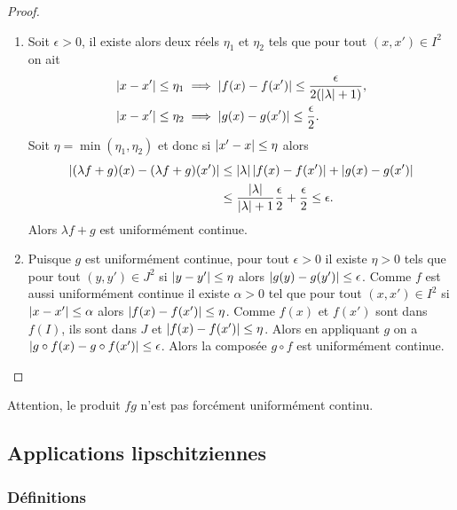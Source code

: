 \begin{proof}
  \begin{enumerate}
  \item Soit $\epsilon >0$, il existe alors deux réels $\eta_1$ et $\eta_2$ tels que pour tout $(x,x') \in I^2$ on ait
    \begin{align}
      \left\lvert x-x'\right\rvert \leq \eta_1 &\implies \left\lvert f(x)-f(x')\right\rvert \leq \frac{\epsilon}{2(\left\lvert\lambda\right\rvert+1)},\\
      \left\lvert x-x'\right\rvert \leq \eta_2 &\implies \left\lvert g(x)-g(x')\right\rvert \leq \frac{\epsilon}{2}.
    \end{align}
    Soit $\eta=\min(\eta_1,\eta_2)$ et donc si $\left\lvert x'-x\right\rvert \leq \eta$ alors 
    \begin{align}
      \left\lvert(\lambda f+g)(x)-(\lambda f+g)(x')\right\rvert &\leq \left\lvert\lambda\right\rvert \left\lvert f(x)-f(x')\right\rvert + \left\lvert g(x)-g(x')\right\rvert \\
      &\leq \frac{\left\lvert\lambda\right\rvert}{\left\lvert\lambda\right\rvert +1} \frac{\epsilon}{2}+\frac{\epsilon}{2} \leq \epsilon.
    \end{align}
    Alors $\lambda f+g$ est uniformément continue.
  \item Puisque $g$ est uniformément continue, pour tout $\epsilon >0$ il existe $\eta >0$ tels que pour tout $(y,y') \in J^2$ si $\left\lvert y-y'\right\rvert \leq \eta$ alors $\left\lvert g(y)-g(y')\right\rvert \leq \epsilon$. Comme $f$ est aussi uniformément continue il existe $\alpha >0$ tel que pour tout $(x,x') \in I^2$ si $\left\lvert x-x'\right\rvert \leq \alpha$ alors $\left\lvert f(x)-f(x')\right\rvert \leq \eta$. Comme $f(x)$ et $f(x')$ sont dans $f(I)$, ils sont dans $J$ et $\left\lvert f(x)-f(x')\right\rvert \leq \eta$. Alors en appliquant $g$ on a $\left\lvert g \circ f(x)-g \circ f(x')\right\rvert \leq \epsilon$. Alors la composée $g \circ f$ est uniformément continue.
  \end{enumerate}
\end{proof}
Attention, le produit $fg$ n'est pas forcément uniformément continu.

\subsection{Applications lipschitziennes}

\subsubsection{Définitions}

